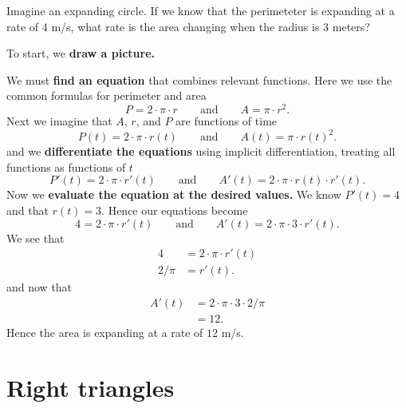 \documentclass{ximera}
\begin{document}
\begin{example}
  Imagine an expanding circle. If we know that the perimeteter is
  expanding at a rate of $4$ m/s, what rate is the area changing
  when the radius is $3$ meters?
  \begin{explanation}
    To start, we \textbf{draw a picture.}
    \begin{image}
    \end{image}
    We must \textbf{find an equation} that combines relevant
    functions. Here we use the common formulas for perimeter and area
    \[
    P = 2\cdot \pi \cdot r
    \qquad\text{and}\qquad
    A = \pi \cdot r^2.
    \]
    Next we imagine that $A$, $r$, and $P$ are functions of time
    \[
    P(t) = 2\cdot \pi \cdot r(t)
    \qquad\text{and}\qquad
    A(t) = \pi \cdot r(t)^2.
    \]
    and we \textbf{differentiate the equations} using implicit
    differentiation, treating all functions as functions of $t$
    \[
    P'(t) = 2\cdot \pi\cdot r'(t)
    \qquad\text{and}\qquad
    A'(t) = 2\cdot \pi\cdot r(t) \cdot r'(t).
    \]
    Now we \textbf{evaluate the equation at the desired values.} We
    know $P'(t) = 4$ and that $r(t) = 3$. Hence our equations become
    \[
    4 = 2\cdot \pi\cdot r'(t)
    \qquad\text{and}\qquad
    A'(t) = 2\cdot \pi\cdot 3 \cdot r'(t).
    \]
    We see that
    \begin{align*}
      4 &= 2\cdot \pi\cdot r'(t)\\
      2/\pi &= r'(t).
    \end{align*}
    and now that
    \begin{align*}
      A'(t) &= 2\cdot \pi\cdot 3 \cdot 2/\pi\\
      &=12.
    \end{align*}
    Hence the area is expanding at a rate of $12$ m/s.
  \end{explanation}
\end{example}



\section{Right triangles}
\end{document}
